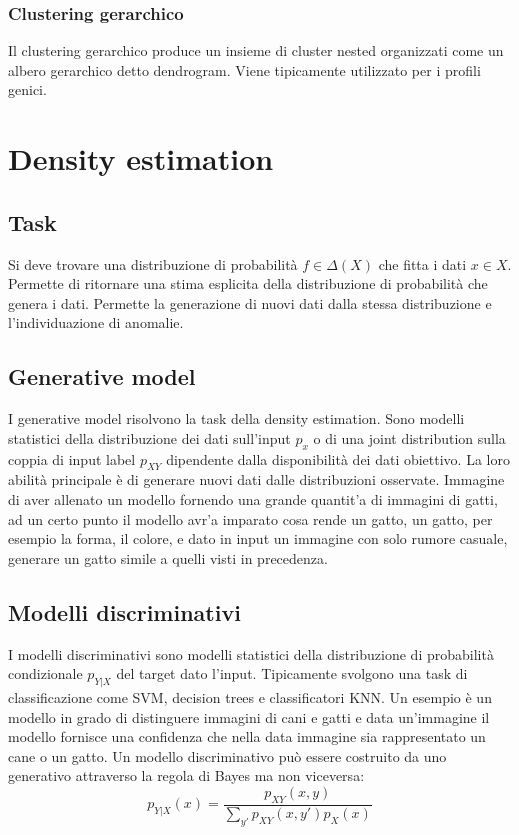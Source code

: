 \subsubsection{Clustering gerarchico}
Il clustering gerarchico produce un insieme di cluster nested organizzati come un albero gerarchico detto dendrogram.
Viene tipicamente utilizzato per i profili genici.

\section{Density estimation}

\subsection{Task}
Si deve trovare una distribuzione di probabilit\`a $f\in \Delta(X)$ che fitta i dati $x\in X$.
Permette di ritornare una stima esplicita della distribuzione di probabilit\`a che genera i dati.
Permette la generazione di nuovi dati dalla stessa distribuzione e l'individuazione di anomalie.

\subsection{Generative model}
I generative model risolvono la task della density estimation.
Sono modelli statistici della distribuzione dei dati sull'input $p_x$ o di una joint distribution sulla coppia di input label $p_{XY}$ dipendente dalla disponibilit\`a dei dati obiettivo.
La loro abilit\`a principale \`e di generare nuovi dati dalle distribuzioni osservate. Immagine di aver allenato un modello fornendo una grande quantit'a di immagini di gatti, ad un certo punto il modello avr'a imparato cosa rende un gatto, un gatto, per esempio la forma, il colore, e dato in input un immagine con solo rumore casuale, generare un gatto simile a quelli visti in precedenza.

\subsection{Modelli discriminativi}
I modelli discriminativi sono modelli statistici della distribuzione di probabilit\`a condizionale $p_{Y|X}$ del target dato l'input.
Tipicamente svolgono una task di classificazione come SVM, decision trees e classificatori KNN. Un esempio \`e un modello in grado di distinguere immagini di cani e gatti e data un'immagine il modello fornisce una confidenza che nella data immagine sia rappresentato un cane o un gatto.
Un modello discriminativo pu\`o essere costruito da uno generativo attraverso la regola di Bayes ma non viceversa:
$$p_{Y|X}(x) = \dfrac{p_{XY}(x,y)}{\sum\limits_{y'}p_{XY}(x,y')p_X(x)}$$

